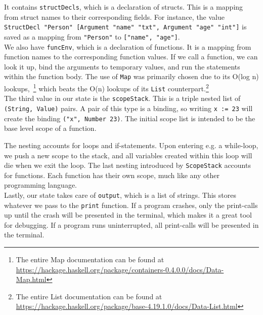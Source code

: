 It contains \texttt{structDecls}, which is a declaration of structs. This is a mapping from struct names to their corresponding fields. For instance, the value \texttt{StructDecl "Person" [Argument "name" "txt", Argument "age" "int"]} is saved as a mapping from \texttt{"Person"} to \texttt{["name", "age"]}. \hfill \\

We also have \texttt{funcEnv}, which is a declaration of functions. It is a mapping from function names to the corresponding function values. If we call a function, we can look it up, bind the arguments to temporary values, and run the statements within the function body. The use of \texttt{Map} was primarily chosen due to its O(log n) lookups,~\footnote{The entire Map documentation can be found at \url{https://hackage.haskell.org/package/containers-0.4.0.0/docs/Data-Map.html}} which beats the O(n) lookups of its \texttt{List} counterpart.\footnote{The entire List documentation can be found at \url{https://hackage.haskell.org/package/base-4.19.1.0/docs/Data-List.html}} \hfill \\

The third value in our state is the \texttt{scopeStack}. This is a triple nested list of \texttt{(String, Value)} pairs. A pair of this type is a binding, so writing \texttt{x := 23} will create the binding \texttt{("x", Number 23)}. The initial scope list is intended to be the base level scope of a function. \hfill \\


The nesting accounts for loops and if-statements. Upon entering e.g. a while-loop, we push a new scope to the stack, and all variables created within this loop will die when we exit the loop. The last nesting introduced by \texttt{ScopeStack} accounts for functions. Each function has their own scope, much like any other programming language. \hfill \\

Lastly, our state takes care of \texttt{output}, which is a list of strings. This stores whatever we pass to the \texttt{print} function. If a program crashes, only the print-calls up until the crash will be presented in the terminal, which makes it a great tool for debugging. If a program runs uninterrupted, all print-calls will be presented in the terminal.

